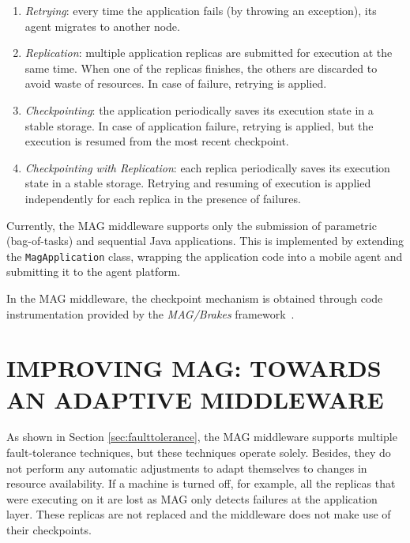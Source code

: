 \documentclass{cpeauth}
\begin{document}
\begin{enumerate}
    \item \emph{Retrying}: every time the application fails (by throwing an exception), its agent migrates to another node.

    \item \emph{Replication}: multiple application replicas are submitted
for execution at the same time. When one of the replicas finishes, the others
are discarded to avoid waste of resources. In case of failure,
retrying is applied.
   
    \item \emph{Checkpointing}: the application periodically saves its execution
state in a stable storage. In case of application failure, retrying is
applied, but the execution is resumed from the most recent checkpoint.
 
    \item \emph{Checkpointing with Replication}: each replica periodically saves
its execution state in a stable storage. Retrying and resuming of execution is
applied independently for each replica in the presence of failures.

\end{enumerate}

Currently, the MAG middleware supports only the submission of parametric (bag-of-tasks) and
sequential Java applications. This is implemented by extending
the {\tt MagApplication} class, wrapping the application code into a mobile agent and submitting
it to the agent platform. 

In the MAG middleware, the checkpoint mechanism is obtained through code
instrumentation provided by the \emph{MAG/Brakes} framework~\cite{brakes00}.

\section{IMPROVING MAG: TOWARDS AN ADAPTIVE MIDDLEWARE}\label{sec:adapt}

As shown in Section \ref{sec:faulttolerance}, the MAG middleware supports
multiple fault-tolerance techniques, but these techniques operate solely.
Besides, they do not perform any automatic adjustments to adapt themselves
to changes in resource availability. If a machine is turned off, for
example, all the replicas that were executing on it are lost as MAG only
detects failures at the application layer. These replicas are not replaced and
the middleware does not make use of their checkpoints.
\end{document}
